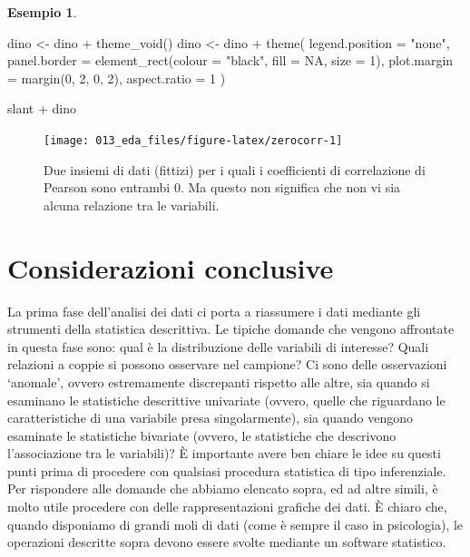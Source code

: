 \documentclass[
  10pt,
  italian,
  a4paper,
  extrafontsizes,onecolumn,openright
  ]{memoir}
\newenvironment{Shaded}{\begin{snugshade}}{\end{snugshade}}
\newcommand{\AttributeTok}[1]{\textcolor[rgb]{0.77,0.63,0.00}{#1}}
\newcommand{\ConstantTok}[1]{\textcolor[rgb]{0.00,0.00,0.00}{#1}}
\newcommand{\DecValTok}[1]{\textcolor[rgb]{0.00,0.00,0.81}{#1}}
\newcommand{\FunctionTok}[1]{\textcolor[rgb]{0.00,0.00,0.00}{#1}}
\newcommand{\NormalTok}[1]{#1}
\newcommand{\OtherTok}[1]{\textcolor[rgb]{0.56,0.35,0.01}{#1}}
\newcommand{\SpecialCharTok}[1]{\textcolor[rgb]{0.00,0.00,0.00}{#1}}
\newcommand{\StringTok}[1]{\textcolor[rgb]{0.31,0.60,0.02}{#1}}
\theoremstyle{definition}
\theoremstyle{definition}
\newtheorem{example}{Esempio}[chapter]
\theoremstyle{definition}
\theoremstyle{definition}
\theoremstyle{remark}
\begin{document}
\begin{example}
\begin{Shaded}
\begin{Highlighting}[]
\NormalTok{dino }\OtherTok{\textless{}{-}}\NormalTok{ dino }\SpecialCharTok{+}
  \FunctionTok{theme\_void}\NormalTok{()}
\NormalTok{dino }\OtherTok{\textless{}{-}}\NormalTok{ dino }\SpecialCharTok{+}
  \FunctionTok{theme}\NormalTok{(}
    \AttributeTok{legend.position =} \StringTok{"none"}\NormalTok{,}
    \AttributeTok{panel.border =} \FunctionTok{element\_rect}\NormalTok{(}\AttributeTok{colour =} \StringTok{"black"}\NormalTok{, }\AttributeTok{fill =} \ConstantTok{NA}\NormalTok{, }\AttributeTok{size =} \DecValTok{1}\NormalTok{),}
    \AttributeTok{plot.margin =} \FunctionTok{margin}\NormalTok{(}\DecValTok{0}\NormalTok{, }\DecValTok{2}\NormalTok{, }\DecValTok{0}\NormalTok{, }\DecValTok{2}\NormalTok{), }\AttributeTok{aspect.ratio =} \DecValTok{1}
\NormalTok{  )}

\NormalTok{slant }\SpecialCharTok{+}\NormalTok{ dino}
\end{Highlighting}
\end{Shaded}

\begin{figure}[h]

{\centering \texttt{[image: 013\_eda\_files/figure-latex/zerocorr-1]} 

}

\caption{Due insiemi di dati (fittizi) per i quali i coefficienti di correlazione di Pearson sono entrambi 0. Ma questo non significa che non vi sia alcuna relazione tra le variabili.}\label{fig:zerocorr}
\end{figure}

\end{example}

\hypertarget{considerazioni-conclusive}{%
\section*{Considerazioni conclusive}\label{considerazioni-conclusive}}

La prima fase dell'analisi dei dati ci porta a riassumere i dati mediante gli strumenti della statistica descrittiva.
Le tipiche domande che vengono affrontate in questa fase sono: qual è la
distribuzione delle variabili di interesse? Quali relazioni a coppie si
possono osservare nel campione? Ci sono delle osservazioni `anomale',
ovvero estremamente discrepanti rispetto alle altre, sia quando si
esaminano le statistiche descrittive univariate (ovvero, quelle che
riguardano le caratteristiche di una variabile presa singolarmente), sia
quando vengono esaminate le statistiche bivariate (ovvero, le
statistiche che descrivono l'associazione tra le variabili)? È
importante avere ben chiare le idee su questi punti prima di procedere
con qualsiasi procedura statistica di tipo inferenziale. Per rispondere
alle domande che abbiamo elencato sopra, ed ad altre simili, è molto
utile procedere con delle rappresentazioni grafiche dei dati. È chiaro che, quando disponiamo di grandi moli di dati (come è sempre il caso in psicologia), le operazioni descritte sopra devono essere svolte mediante un software statistico.
\end{document}
